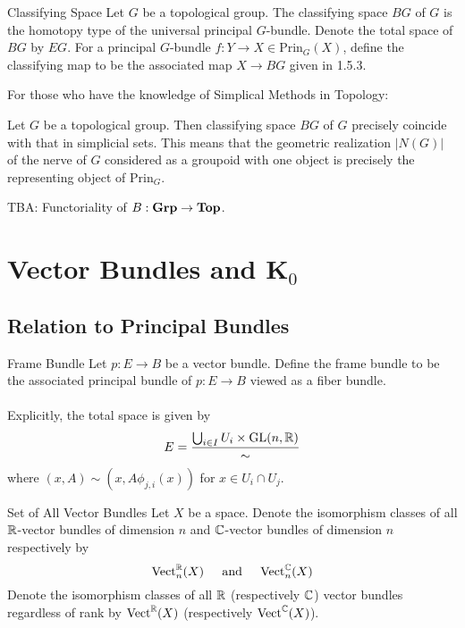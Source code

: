 \documentclass[a4paper]{article}
\begin{document}
\begin{defn}{Classifying Space}{} Let $G$ be a topological group. The classifying space $BG$ of $G$ is the homotopy type of the universal principal $G$-bundle. Denote the total space of $BG$ by $EG$. For a principal $G$-bundle $f:Y\to X\in\text{Prin}_G(X)$, define the classifying map to be the associated map $X\to BG$ given in 1.5.3. 
\end{defn}

For those who have the knowledge of Simplical Methods in Topology: 

\begin{thm}{}{} Let $G$ be a topological group. Then classifying space $BG$ of $G$ precisely coincide with that in simplicial sets. This means that the geometric realization $|N(G)|$ of the nerve of $G$ considered as a groupoid with one object is precisely the representing object of $\text{Prin}_G$. 
\end{thm}

TBA: Functoriality of $B:\bold{Grp}\to\bold{Top}$. 

\pagebreak
\section{Vector Bundles and K${_0}$}
\subsection{Relation to Principal Bundles}
\begin{defn}{Frame Bundle}{} Let $p:E\to B$ be a vector bundle. Define the frame bundle to be the associated principal bundle of $p:E\to B$ viewed as a fiber bundle. \\~\\

Explicitly, the total space is given by $$E=\frac{\bigcup_{i\in I}U_i\times\text{GL}(n,\mathbb{R})}{\sim}$$ where $(x,A)\sim(x,A\phi_{j,i}(x))$ for $x\in U_i\cap U_j$. 
\end{defn}

\begin{defn}{Set of All Vector Bundles}{} Let $X$ be a space. Denote the isomorphism classes of all $\mathbb{R}$-vector bundles of dimension $n$ and $\mathbb{C}$-vector bundles of dimension $n$ respectively by $$\text{Vect}_n^{\mathbb{R}}(X)\;\;\;\;\text{ and }\;\;\;\;\text{Vect}_n^{\mathbb{C}}(X)$$ Denote the isomorphism classes of all $\mathbb{R}$ (respectively $\mathbb{C}$) vector bundles regardless of rank by $\text{Vect}^{\mathbb{R}}(X)$ (respectively $\text{Vect}^{\mathbb{C}}(X)$). 
\end{defn}
\end{document}

